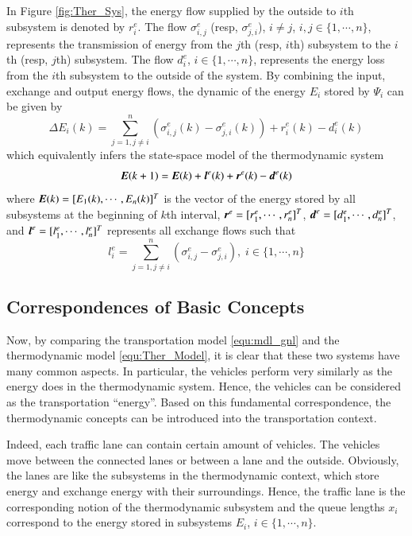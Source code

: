 \documentclass[preprint,authoryear,12pt]{elsarticle}
\renewcommand{\vec}[1]{\mbox{\boldmath$#1$}}
\begin{document}
In Figure \ref{fig:Ther_Sys}, the energy flow supplied by the outside
to $i$th subsystem is denoted by $r^e_i$. The flow $\sigma^e_{i,j}$
(resp, $\sigma^e_{j,i}$), $i\neq j$, $i,j\in \{1,\cdots,n\}$,
represents the transmission of energy from the $j$th (resp, $i$th)
subsystem to the $i$th (resp, $j$th) subsystem. The flow $d^e_i$,
$i\in \{1,\cdots,n\}$, represents the energy loss from the $i$th
subsystem to the outside of the system. By combining the input,
exchange and output energy flows, the dynamic of the energy $E_i$
stored by $\Psi_i$ can be given by
\begin{equation}\label{equ:Ther_Model_SubSystem}
\Delta E_i(k) = \sum_{j=1,j\neq
i}^{n}(\sigma^e_{i,j}(k)-\sigma^e_{j,i}(k))+r^e_i(k)-d^e_i(k)
\end{equation}
which equivalently infers the state-space model of the thermodynamic
system
\begin{equation}\label{equ:Ther_Model}
    \vec{E}(k+1)=\vec{E}(k)+\vec{l}^e(k)+\vec{r}^e(k)-\vec{d}^e(k)
\end{equation}
where $\vec{E}(k)=[E_1(k),\cdots,E_n(k)]^T$ is the vector of the
energy stored by all subsystems at the beginning of $k$th interval,
$\vec{r}^e=[r^e_1,\cdots,r^e_n]^T$,
$\vec{d}^e=[d^e_{1},\cdots,d^e_{n}]^T$, and
$\vec{l}^e=[l^e_1,\cdots,l^e_n]^T$ represents all exchange flows such
that
\begin{equation*}
l^e_i = \sum_{j=1,j\neq i}^{n}
        (\sigma^e_{i,j}-\sigma^e_{j,i}),
\; i\in \{1,\cdots,n\}
\end{equation*}

\subsection{Correspondences of Basic Concepts}

Now, by comparing the transportation model \eqref{equ:mdl_gnl} and
the thermodynamic model \eqref{equ:Ther_Model}, it is clear that
these two systems have many common aspects. In particular, the
vehicles perform very similarly as the energy does in the
thermodynamic system. Hence, the vehicles can be considered as the
transportation ``energy''. Based on this fundamental correspondence,
the thermodynamic concepts can be introduced into the transportation
context.

Indeed, each traffic lane can contain certain amount of vehicles. The
vehicles move between the connected lanes or between a lane and the
outside. Obviously, the lanes are like the subsystems in the
thermodynamic context, which store energy and exchange energy with
their surroundings. Hence, the traffic lane is the corresponding
notion of the thermodynamic subsystem and the queue lengths $x_i$
correspond to the energy stored in subsystems $E_i$,
$i\in\{1,\cdots,n\}$.
\end{document}
